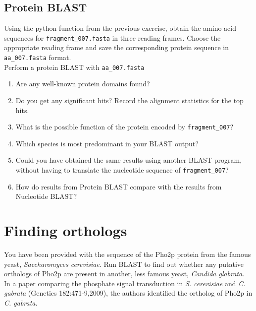 \documentclass[a4paper,11pt]{article}
\begin{document}
\subsection{Protein BLAST}

Using the python function from the previous exercise, obtain the amino acid sequences for \texttt{fragment\_007.fasta} in three reading frames. Choose the appropriate reading frame and save the corresponding protein sequence in \texttt{aa\_007.fasta} format.\\

Perform a protein BLAST with \texttt{aa\_007.fasta} 

\begin{enumerate}
\item Are any well-known protein domains found? 

\item Do you get any significant hits? Record the alignment statistics for the top hits. 

\item What is the possible function of the protein encoded by \texttt{fragment\_007}?

\item Which species is most predominant in your BLAST output?

\item Could you have obtained the same results using another BLAST program, without having to translate the nucleotide sequence of \texttt{fragment\_007}?

\item How do results from Protein BLAST compare with the results from Nucleotide BLAST?


\end{enumerate}

\section{Finding orthologs}

You have been provided with the sequence of the Pho2p protein from the famous yeast, \emph{Saccharomyces cerevisiae}. Run BLAST to find out whether any putative orthologs of Pho2p are present in another, less famous yeast, \emph{Candida glabrata}.\\

In a paper comparing the phosphate signal transduction in \emph{S. cerevisiae} and \emph{C. gabrata} (Genetics 182:471-9,2009), the authors identified the ortholog of Pho2p in \emph{C. gabrata}. \\
\end{document}
